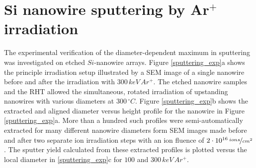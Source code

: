 



\section{Si nanowire sputtering by Ar$^+$ irradiation}
\label{sec:sisputtering}

The experimental verification of the diameter-dependent maximum in sputtering was investigated on etched $Si$-nanowire arrays. Figure \ref{sputtering_exp}a shows the principle irradiation setup illustrated by a SEM image of a single nanowire before and after the irradiation with $300\,keV\,Ar^+$. The etched nanowire samples and the RHT allowed the simultaneous, rotated irradiation of upstanding nanowires with various diameters at $300\,^\circ C$. Figure \ref{sputtering_exp}b shows the extracted and aligned diameter versus height profile for the nanowire in Figure \ref{sputtering_exp}a. More than a hundred such profiles were semi-automatically extracted for many different nanowire diameters form SEM images made before and after two separate ion irradiation steps with an ion fluence of $2\cdot10^{16}\,\nicefrac{ions}{cm^2}$. The sputter yield calculated from these extracted profiles is plotted versus the local diameter in \ref{sputtering_exp}c for $100$ and $300\,keV\,Ar^+$.

